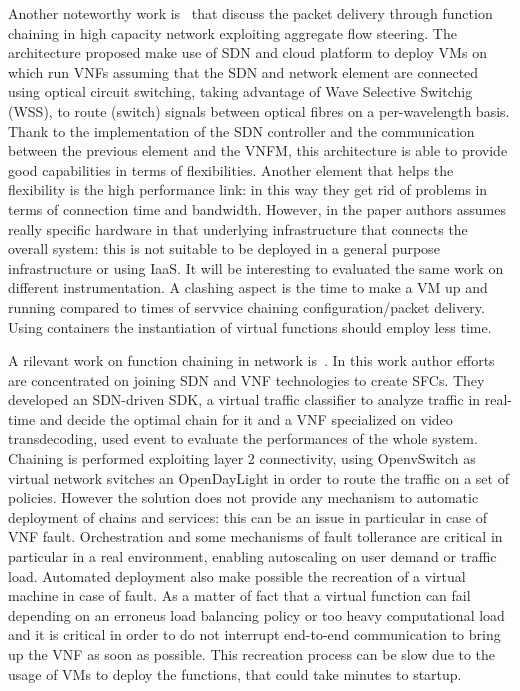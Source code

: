 Another noteworthy work is~\cite{xia2015optical} that discuss the packet
delivery through function chaining in high capacity network exploiting aggregate
flow steering. The architecture proposed make use of SDN and cloud platform to
deploy VMs on which run VNFs assuming that the SDN and network element are
connected using optical circuit switching, taking advantage of Wave Selective
Switchig (WSS), to route (switch) signals between optical fibres on a
per-wavelength basis. Thank to the implementation of the SDN controller and the
communication between the previous element and the VNFM, this architecture is
able to provide good capabilities in terms of flexibilities. Another element
that helps the flexibility is the high performance link: in this way they get
rid of problems in terms of connection time and bandwidth. However, in the paper
authors assumes really specific hardware in that underlying infrastructure that
connects the overall system: this is not suitable to be deployed in a general
purpose infrastructure or using IaaS. It will be interesting to evaluated the
same work on different instrumentation. A clashing aspect is the time to make a
VM up and running compared to times of servvice chaining configuration/packet
delivery. Using containers the instantiation of virtual functions should employ
less time.

A rilevant work on function chaining in network is~\cite{trajkovska2017sdn}. In
this work author efforts are concentrated on joining SDN and VNF technologies to
create SFCs. They developed an SDN-driven SDK, a virtual traffic classifier to
analyze traffic in real-time and decide the optimal chain for it and a VNF
specialized on video transdecoding, used event to evaluate the performances of
the whole system. Chaining is performed exploiting layer 2 connectivity,
using OpenvSwitch as virtual network svitches an OpenDayLight in order to
route the traffic on a set of policies. However the solution does not provide
any mechanism to automatic deployment of chains and services: this can be an
issue in particular in case of VNF fault. Orchestration and some mechanisms of
fault tollerance are critical in particular in a real environment, enabling
autoscaling on user demand or traffic load. Automated deployment also make
possible the recreation of a virtual machine in case of fault. As a matter of
fact that a virtual function can fail depending on an erroneus load balancing
policy or too heavy computational load and it is critical in order to do not
interrupt end-to-end communication to bring up the VNF as soon as possible. This
recreation process can be slow due to the usage of VMs to deploy the
functions, that could take minutes to startup.


